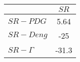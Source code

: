 \begin{tabular}{l|c}
\toprule
{} &  $SR$ \\
\midrule
\textbf{$SR-PDG$   } &  5.64 \\
\textbf{$SR-Deng$  } &   -25 \\
\textbf{$SR-\Gamma$} & -31.3 \\
\bottomrule
\end{tabular}
